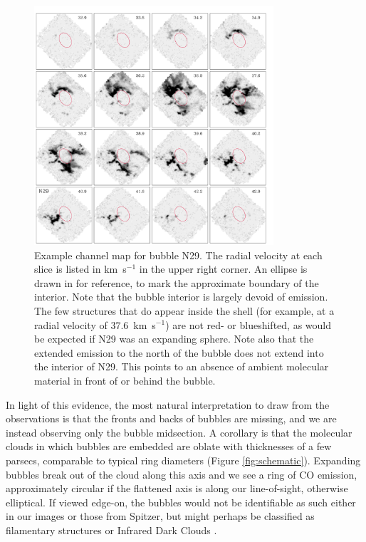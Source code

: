 \begin{figure}
\includegraphics[width=3.5in, angle=0]{channel029}
\caption{Example channel map for bubble N29. The radial velocity at each slice is listed in km\, s$^{-1}$ in the upper right corner.
An ellipse is drawn in for reference, to mark the approximate boundary of the interior.
Note that the bubble interior is largely devoid of emission. The few structures that do appear inside the shell (for example,
at a radial velocity of 37.6~km~s$^{-1}$) are not red- or blueshifted, as would be expected if N29 was an expanding sphere.
Note also that the extended emission to the north of the bubble does not extend into the interior of N29. This points to
an absence of ambient molecular material in front of or behind the bubble.}
\label{fig:channelmap}
\end{figure}



In light of this evidence, the most natural interpretation to draw from the observations
is that the fronts and backs of bubbles are missing,
and we are instead observing only the bubble midsection.
A corollary is that the molecular clouds in which bubbles are
embedded are oblate with thicknesses
of a few parsecs, comparable to typical ring diameters (Figure \ref{fig:schematic}).
Expanding bubbles break out of the cloud along this axis
and we see a ring of CO emission, approximately circular if
the flattened axis is along our line-of-sight, otherwise
elliptical. If viewed edge-on, the bubbles would not be identifiable
as such either in our images or those from Spitzer, but might
perhaps be classified as filamentary structures or Infrared Dark Clouds \citep{Simon06, Jackson08}.



